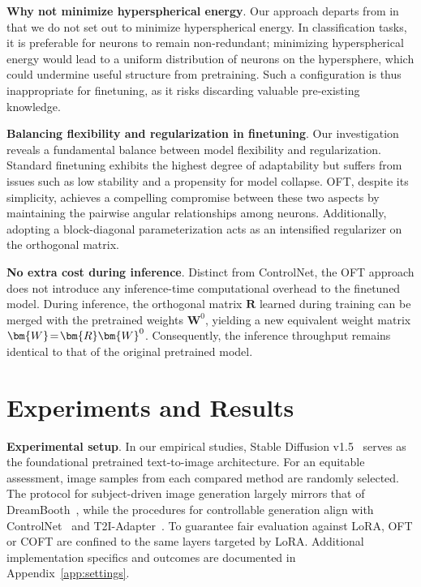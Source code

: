 \textbf{Why not minimize hyperspherical energy}. Our approach departs from \cite{liu2021orthogonal} in that we do not set out to minimize hyperspherical energy. In classification tasks, it is preferable for neurons to remain non-redundant; minimizing hyperspherical energy would lead to a uniform distribution of neurons on the hypersphere, which could undermine useful structure from pretraining. Such a configuration is thus inappropriate for finetuning, as it risks discarding valuable pre-existing knowledge.

\textbf{Balancing flexibility and regularization in finetuning}. Our investigation reveals a fundamental balance between model flexibility and regularization. Standard finetuning exhibits the highest degree of adaptability but suffers from issues such as low stability and a propensity for model collapse. OFT, despite its simplicity, achieves a compelling compromise between these two aspects by maintaining the pairwise angular relationships among neurons. Additionally, adopting a block-diagonal parameterization acts as an intensified regularizer on the orthogonal matrix.

\textbf{No extra cost during inference}. Distinct from ControlNet, the OFT approach does not introduce any inference-time computational overhead to the finetuned model. During inference, the orthogonal matrix $\bm{R}$ learned during training can be merged with the pretrained weights $\bm{W}^0$, yielding a new equivalent weight matrix $\thickmuskip=2mu \medmuskip=2mu \bm{W}=\bm{R}\bm{W}^0$. Consequently, the inference throughput remains identical to that of the original pretrained model.

\section{Experiments and Results}

\textbf{Experimental setup}. In our empirical studies, Stable Diffusion v1.5~\cite{rombach2022high} serves as the foundational pretrained text-to-image architecture. For an equitable assessment, image samples from each compared method are randomly selected. The protocol for subject-driven image generation largely mirrors that of DreamBooth~\cite{ruiz2023dreambooth}, while the procedures for controllable generation align with ControlNet~\cite{zhang2023adding} and T2I-Adapter~\cite{mou2023t2i}. To guarantee fair evaluation against LoRA, OFT or COFT are confined to the same layers targeted by LoRA. Additional implementation specifics and outcomes are documented in Appendix~\ref{app:settings}.


